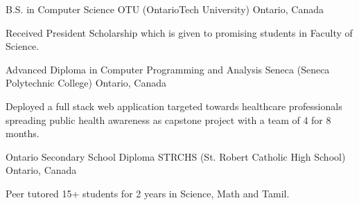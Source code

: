 

\begin{cventries}

  \cventry
    {B.S. in Computer Science} %
    {OTU (OntarioTech University)} %
    {Ontario, Canada} %
    {} %
    {
      \begin{cvitems} %
        \item {Received President Scholarship which is given to promising students in Faculty of Science.}
      \end{cvitems}
    }

  \cventry
  {Advanced Diploma in Computer Programming and Analysis} %
  {Seneca (Seneca Polytechnic College)} %
  {Ontario, Canada} %
  {} %
  {
    \begin{cvitems} %
      \item {Deployed a full stack web application targeted towards healthcare professionals spreading public health awareness as capstone project with a team of 4 for 8 months.}
    \end{cvitems}
  }

  \cventry
    {Ontario Secondary School Diploma} %
    {STRCHS (St. Robert Catholic High School)} %
    {Ontario, Canada} %
    {} %
    {
      \begin{cvitems} %
        \item {Peer tutored 15+ students for 2 years in Science, Math and Tamil.}
      \end{cvitems}
    }
\end{cventries}


